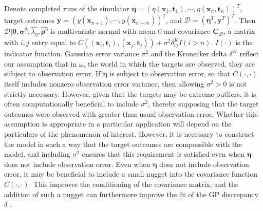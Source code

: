 \documentclass[12pt]{article}
\begin{document}

%
Denote completed runs of the simulator $\boldsymbol \eta = (\eta(\mathbf x_1,\mathbf t_1),\cdots,\eta(\mathbf x_n,\mathbf t_n))^T$, target outcomes $\mathbf y = (y(\mathbf x_{n+1}),\cdots,y(\mathbf x_{n+m}))^T$, 
and $\mathcal D = (\boldsymbol \eta^T,\mathbf y^T)^T$.
%
Then $\mathcal D | \boldsymbol \theta,\boldsymbol\sigma^2,\widehat{\lambda_\eta}, \widehat{\boldsymbol \rho^\eta}$ is multivariate normal with mean 0 and covariance $\mathbf C_\mathcal D$, a matrix with $i,j$ entry equal to 
$
C((\mathbf x_i,\mathbf t_i),(\mathbf x_j,\mathbf t_j)) + 
\sigma^2 \delta_{ij}^K I(i>n).
$
%
$I(\cdot)$ is the indicator function. 
%
Gaussian error variance $\sigma^2$ and the Kronecker delta $\delta^K$ reflect our assumption that in $\omega$, the world in which the targets are observed, they are subject to observation error.
%
If $\boldsymbol\eta$ is subject to observation error, so that $C(\cdot,\cdot)$ itself includes nonzero observation error variance, then allowing $\sigma^2>0$ is not strictly necessary.
%
However, given that the targets may be extreme outliers, it is often computationally beneficial to include $\sigma^2$, thereby supposing that the target outcomes were observed with greater than usual observation error.
%
Whether this assumption is appropriate in a particular application will depend on the particulars of the phenomenon of interest.
%
However, it is necessary to construct the model in such a way that the target outcomes are compossible with the model, and including $\sigma^2$ ensures that this requirement is satisfied even when $\boldsymbol\eta$ does not include observation error.
%
Even when $\boldsymbol\eta$ does not include observation error, it may be beneficial to include a small nugget into the covariance function $C(\cdot,\cdot)$.
%
This improves the conditioning of the covariance matrix, and the addition of such a nugget can furthermore improve the fit of the GP discrepancy $\delta$ \citep{Gramacy2012}.
%
\end{document}

